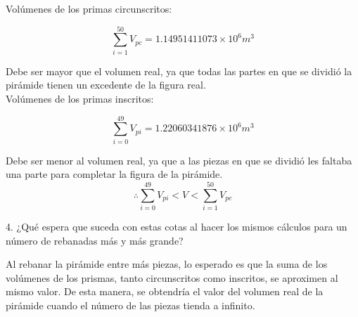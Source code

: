 \documentclass[12pt]{article}
\begin{document}
Volúmenes de los primas circunscritos: 

\[
\sum_{i=1}^{50} V_{pc} = 1.14951411073 \times 10^6 m^3
\]

Debe ser mayor que el volumen real, ya que todas las partes en que se dividió la pirámide tienen un excedente de la figura real.\\

Volúmenes de los primas inscritos:

\[
\sum_{i=0}^{49} V_{pi} = 1.22060341876 \times 10^6 m^3    
\]

Debe ser menor al volumen real, ya que a las piezas en que se dividió les faltaba una parte para completar la figura de la pirámide. \\

\[
\therefore \sum_{i=0}^{49} V_{pi} < V < \sum_{i=1}^{50} V_{pc}
\]

4. ¿Qué espera que suceda con estas cotas al hacer los mismos cálculos para un número de rebanadas más y más grande? 

Al rebanar la pirámide entre más piezas, lo esperado es que la suma de los volúmenes de los prismas, tanto circunscritos como inscritos, se aproximen al mismo valor. De esta manera, se obtendría el valor del volumen real de la pirámide cuando el número de las piezas tienda a infinito.
\clearpage
\end{document}

